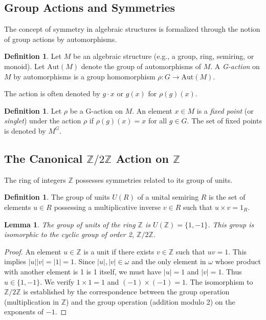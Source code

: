 \documentclass[11pt, a4paper]{article}
\theoremstyle{plain}
\newtheorem{lemma}[theorem]{Lemma}
\theoremstyle{definition}
\newtheorem{definition}[theorem]{Definition}
\numberwithin{equation}{section}
\newcommand{\Z}{\mathbb{Z}}
\newcommand{\Ztwo}{\mathbb{Z}/2\mathbb{Z}}
\newcommand{\Aut}{\mathrm{Aut}}
\begin{document}
\subsection{Group Actions and Symmetries}

The concept of symmetry in algebraic structures is formalized through the notion of group actions by automorphisms.

\begin{definition}
Let $M$ be an algebraic structure (e.g., a group, ring, semiring, or monoid). Let $\Aut(M)$ denote the group of automorphisms of $M$. A \emph{G-action} on $M$ by automorphisms is a group homomorphism $\rho: G \to \Aut(M)$.
\end{definition}

The action is often denoted by $g\cdot x$ or $g(x)$ for $\rho(g)(x)$.

\begin{definition}
Let $\rho$ be a G-action on $M$. An element $x \in M$ is a \emph{fixed point} (or \emph{singlet}) under the action $\rho$ if $\rho(g)(x) = x$ for all $g \in G$. The set of fixed points is denoted by $M^G$.
\end{definition}

\subsection{The Canonical \texorpdfstring{$\Ztwo$}{Z/2Z} Action on \texorpdfstring{$\Z$}{Z}}

The ring of integers $\Z$ possesses symmetries related to its group of units.

\begin{definition}
The group of units $U(R)$ of a unital semiring $R$ is the set of elements $u \in R$ possessing a multiplicative inverse $v \in R$ such that $u\times v = 1_R$.
\end{definition}

\begin{lemma}\label{lem:units_Z}
The group of units of the ring $\Z$ is $U(\Z) = \{1, -1\}$. This group is isomorphic to the cyclic group of order 2, $\Ztwo$.
\end{lemma}
\begin{proof}
An element $u \in \Z$ is a unit if there exists $v \in \Z$ such that $uv=1$. This implies $|u||v|=|1|=1$. Since $|u|, |v| \in \omega$ and the only element in $\omega$ whose product with another element is 1 is 1 itself, we must have $|u|=1$ and $|v|=1$. Thus $u \in \{1, -1\}$. We verify $1\times 1 = 1$ and $(-1)\times(-1) = 1$. The isomorphism to $\Ztwo$ is established by the correspondence between the group operation (multiplication in $\Z$) and the group operation (addition modulo 2) on the exponents of $-1$.
\end{proof}
\end{document}
